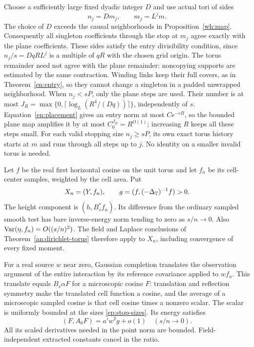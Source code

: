 Choose a sufficiently large fixed dyadic integer $D$ and use actual
tori of sides
\begin{equation}\label{ep:stop-sizes}
 n_j=Dm_j,\qquad m_j=L^jm .
\end{equation}
The choice of $D$ exceeds the causal neighborhoods in
Proposition~\ref{wh:map}.  Consequently all singleton coefficients
through the stop at $m_j$ agree exactly with the plane coefficients.
These sides satisfy the entry divisibility condition, since
$n_j/s=DqR L^j$ is a multiple of $qR$ with the chosen grid origin.
The torus remainder need not agree with the plane remainder:
noncopying supports are estimated by the same contraction.
Winding links keep their full covers, as in Theorem~\ref{en:entry},
so they cannot change a singleton in a padded unwrapped
neighborhood.  When $n_j<sP$, only the plane steps are used.
Their number is at most
$J_R=\max\{0,\lceil\log_L(R^4/(Dq))\rceil\}$, independently of $s$.
Equation~\eqref{en:placement} gives an entry norm at most $Ce^{-cR}$,
so the bounded plane map amplifies it by at most
$C_0^{J_R}=R^{O(1)}$; increasing $R$ keeps all these steps small.
For each valid stopping size $n_j\ge sP$, its own exact torus
history starts at $m$ and runs through all steps up to $j$.
No identity on a smaller invalid torus is needed.

Let $f$ be the real first horizontal cosine on the unit torus and
let $f_n$ be its cell-center samples, weighted by the cell area.
Put
\[
 X_n=(Y,f_n),\qquad
 g=(f,(-\Delta_{\mathbb T})^{-1}f)>0 .
\]
The height component is $(h,B_s^*f_n)$.  Its difference from the
ordinary sampled smooth test has bare inverse-energy norm tending
to zero as $s/n\to0$.  Also
$\operatorname{Var}(\eta,f_n)=O((s/n)^2)$.  The field and Laplace conclusions
of Theorem~\ref{an:dirichlet-torus} therefore apply to $X_n$,
including convergence of every fixed moment.

For a real source $w$ near zero, Gaussian completion translates the
observation argument of the entire interaction by its reference
covariance applied to $wf_n$.  This translate equals $B_s\alpha F$
for a microscopic cosine $F$: translation and reflection symmetry
make the translated cell function a cosine, and the average of a
microscopic sampled cosine is that cell cosine times a nonzero
scalar.  The scalar is uniformly bounded at the sizes
\eqref{ep:stop-sizes}.  Its energy satisfies
\begin{equation}\label{ep:F-energy}
 (F,A_0F)=a'w^2g+o(1)
 \quad(s/n\to0).
\end{equation}
All its scaled derivatives needed in the point norm are bounded.
Field-independent extracted constants cancel in the ratio.


